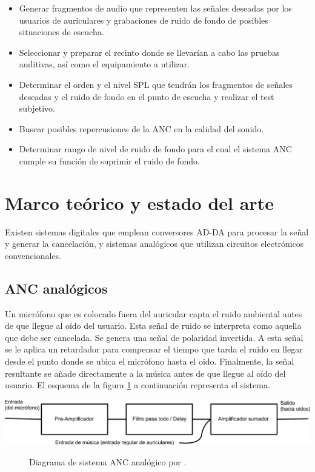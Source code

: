 \documentclass[a4paper,12pt]{article}
\begin{document}
\begin{itemize}[label=\textbullet]
    \item Generar fragmentos de audio que representen las señales deseadas por los usuarios de auriculares y grabaciones de ruido de fondo de posibles situaciones de escucha.

    \item Seleccionar y preparar el recinto donde se llevarían a cabo las pruebas auditivas, así como el equipamiento a utilizar.

    \item Determinar el orden y el nivel SPL que tendrán los fragmentos de señales deseadas y el ruido de fondo en el punto de escucha y realizar el test subjetivo.

    \item Buscar posibles repercusiones de la ANC en la calidad del sonido.

    \item Determinar rango de nivel de ruido de fondo para el cual el sistema ANC cumple su función de suprimir el ruido de fondo.
\end{itemize}

\section{Marco teórico y estado del arte}
\label{sec:background}

Existen sistemas digitales que emplean conversores AD-DA para procesar la señal y generar la cancelación, y sistemas analógicos que utilizan circuitos electrónicos convencionales.

\subsection{ANC analógicos}

Un micrófono que es colocado fuera del auricular capta el ruido ambiental antes de que llegue al oído del usuario.
Esta señal de ruido se interpreta como aquella que debe ser cancelada.
Se genera una señal de polaridad invertida. A esta señal se le aplica un retardador para compensar el tiempo que tarda el ruido en llegar desde el punto donde se ubica el micrófono hasta el oido.
Finalmente, la señal resultante se añade directamente a la música antes de que llegue al oído del usuario.
El esquema de la figura \ref{fig:Kotlicki2016} a continuación representa el sistema.

\begin{center}
    \includegraphics[width=\linewidth]{images/analog_ANC.png}
\end{center}
\vspace{\captionSpace}
\begin{figure}[H]
    \caption{Diagrama de sistema ANC analógico por \textcite{Kotlicki2016}.}
    \label{fig:Kotlicki2016}
\end{figure}
\end{document}
